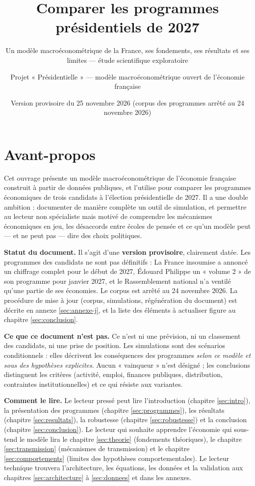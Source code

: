 \documentclass[
  11pt,
  11pt,
  a4paper,
  openany]{book}
\title{Comparer les programmes présidentiels de 2027}
\subtitle{Un modèle macroéconométrique de la France, ses fondements, ses
résultats et ses limites --- étude scientifique exploratoire}
\author{Projet « Présidentielle » --- modèle macroéconométrique ouvert
de l'économie française}
\date{Version provisoire du 25 novembre 2026 (corpus des programmes
arrêté au 24 novembre 2026)}
\begin{document}
\frontmatter
\maketitle

{
\hypersetup{linkcolor=}
\setcounter{tocdepth}{2}
\tableofcontents
}
\mainmatter
\hypertarget{avant-propos}{%
\chapter*{Avant-propos}\label{avant-propos}}

Cet ouvrage présente un modèle macroéconométrique de l'économie
française construit à partir de données publiques, et l'utilise pour
comparer les programmes économiques de trois candidats à l'élection
présidentielle de 2027. Il a une double ambition : documenter de manière
complète un outil de simulation, et permettre au lecteur non spécialiste
mais motivé de comprendre les mécanismes économiques en jeu, les
désaccords entre écoles de pensée et ce qu'un modèle peut --- et ne peut
pas --- dire des choix politiques.

\textbf{Statut du document.} Il s'agit d'une \textbf{version
provisoire}, clairement datée. Les programmes des candidats ne sont pas
définitifs : La France insoumise a annoncé un chiffrage complet pour le
début de 2027, Édouard Philippe un « volume 2 » de son programme pour
janvier 2027, et le Rassemblement national n'a ventilé qu'une partie de
ses économies. Le corpus est arrêté au 24 novembre 2026. La procédure de
mise à jour (corpus, simulations, régénération du document) est décrite
en annexe \ref{sec:annexe-j}, et la liste des éléments à actualiser
figure au chapitre \ref{sec:conclusion}.

\textbf{Ce que ce document n'est pas.} Ce n'est ni une prévision, ni un
classement des candidats, ni une prise de position. Les simulations sont
des scénarios conditionnels : elles décrivent les conséquences des
programmes \emph{selon ce modèle et sous des hypothèses explicites}.
Aucun « vainqueur » n'est désigné ; les conclusions distinguent les
critères (activité, emploi, finances publiques, distribution,
contraintes institutionnelles) et ce qui résiste aux variantes.

\textbf{Comment le lire.} Le lecteur pressé peut lire l'introduction
(chapitre \ref{sec:intro}), la présentation des programmes (chapitre
\ref{sec:programmes}), les résultats (chapitre \ref{sec:resultats}), la
robustesse (chapitre \ref{sec:robustesse}) et la conclusion (chapitre
\ref{sec:conclusion}). Le lecteur qui souhaite apprendre l'économie qui
sous-tend le modèle lira le chapitre \ref{sec:theorie} (fondements
théoriques), le chapitre \ref{sec:transmission} (mécanismes de
transmission) et le chapitre \ref{sec:comportements} (limites des
hypothèses comportementales). Le lecteur technique trouvera
l'architecture, les équations, les données et la validation aux
chapitres \ref{sec:architecture} à \ref{sec:donnees} et dans les
annexes.
\end{document}
